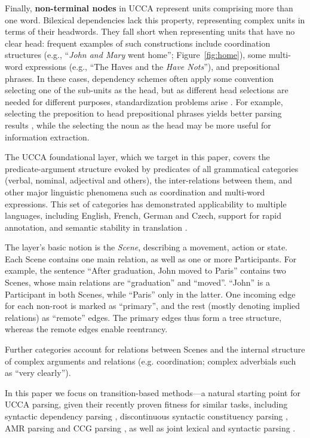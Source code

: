 \documentclass[11pt]{article}
\newcommand{\figref}[1]{Figure~\ref{#1}}
\begin{document}
Finally, \textbf{non-terminal nodes} in UCCA represent units comprising more than one word.
Bilexical dependencies lack this property, representing complex units in terms of their headwords.
They fall short when representing units that have no clear head:
frequent examples of such constructions include
coordination structures (e.g., ``\textit{John and Mary} went home''; \figref{fig:home}),
some multi-word expressions (e.g., ``The Haves and the \textit{Have Nots}''),
and prepositional phrases.
In these cases, dependency schemes often apply some convention selecting one of the sub-units
as the head, but as different head selections are needed for different purposes,
standardization problems arise \cite{Ivanova2012who}.
For example, selecting the preposition to head prepositional phrases yields better
parsing results \cite{Schwartz:12}, while the selecting the noun as the head may be more useful for
information extraction.

The UCCA foundational layer, which we target in this paper, covers the predicate-argument
structure evoked by predicates of all grammatical categories
(verbal, nominal, adjectival and others), the inter-relations between them,
and other major linguistic phenomena such as coordination and multi-word expressions.
This set of categories has demonstrated applicability to multiple languages, including
English, French, German and Czech, support for rapid annotation, and semantic stability in translation \cite{sulem2015conceptual}.

The layer's basic notion is the {\it Scene}, describing a movement, action or state.
Each Scene contains one main relation, as well as one or more Participants.
For example, the sentence ``After graduation, John moved to Paris'' contains two Scenes,
whose main relations are ``graduation'' and ``moved''. ``John'' is a Participant in both Scenes,
while ``Paris'' only in the latter.
One incoming edge for each non-root is marked as ``primary'',
and the rest (mostly denoting implied relations) as ``remote'' edges.
The primary edges thus form a tree structure,
whereas the remote edges enable reentrancy.

Further categories account for relations between Scenes and the internal structure of
complex arguments and relations
(e.g. coordination; complex adverbials such as ``very clearly'').

In this paper we focus on transition-based methods---a natural starting point for UCCA parsing,
given their recently proven fitness for similar tasks, including syntactic dependency parsing
\cite{dyer2015transition,andor2016globally,kiperwasser2016simple},
discontinuous syntactic constituency parsing \cite{maier-lichte:2016:DiscoNLP},
AMR parsing \cite{wang2015transition,wang-EtAl:2016:SemEval}
and CCG parsing \cite{ambati2015incremental,ambati-deoskar-steedman:2016:N16-1},
as well as joint lexical and syntactic parsing
\cite{constant-nivre:2016:P16-1}.
\end{document}
